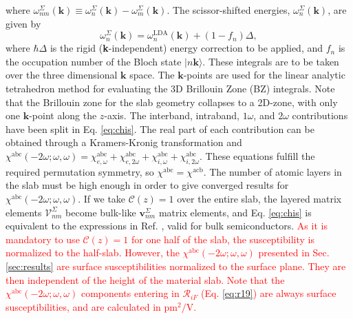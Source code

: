 \documentclass[prb,superscriptaddress,showpacs,twocolumn,letterpaper]{revtex4}
\newcommand{\correction}[1]{\textcolor{red}{#1}}
\begin{document}
where $\omega^\Sigma_{nm}(\mathbf{k})\equiv\omega^\Sigma_n(\mathbf{k})-\omega^
\Sigma_m(\mathbf{k})$. The scissor-shifted energies,
$\omega_{n}^\Sigma(\mathbf{k})$, are given by
\begin{equation*}
\omega_{n}^\Sigma(\mathbf{k})=
\omega^\mathrm{LDA}_{n}(\mathbf{k})+(1-f_{n})\Delta,
\end{equation*}
where $\hbar\Delta$ is the rigid (\textbf{k}-independent) energy correction to
be applied, and $f_n$ is the occupation number of the Bloch state
$|n\mathbf{k}\rangle$. These integrals are to be taken over the three
dimensional $\mathbf{k}$ space. The $\mathbf{k}$-points are used for the linear
analytic tetrahedron method for evaluating the 3D Brillouin Zone (BZ)
integrals.\cite{nastosPRB05} Note that the Brillouin zone for the slab geometry
collapses to a 2D-zone, with only one $\mathbf{k}$-point along the $z$-axis. The
interband, intraband, $1\omega$, and $2\omega$ contributions have been split in
Eq. \eqref{eq:chis}. The real part of each contribution can be obtained through
a Kramers-Kronig transformation\cite{nicolasPRB14} and
$\chi^{\text{a}\text{b}\text{c}}(-2\omega;\omega,\omega)=
 \chi^{\text{a}\text{b}\text{c}}_{e,\omega}
+\chi^{\text{a}\text{b}\text{c}}_{e,2\omega}
+\chi^{\text{a}\text{b}\text{c}}_{i,\omega}
+\chi^{\text{a}\text{b}\text{c}}_{i,2\omega}$. These equations fulfill the
required permutation symmetry, so
$\chi^{\text{a}\text{b}\text{c}}=\chi^{\text{a}\text{c}\text{b}}$. The number of
atomic layers in the slab must be high enough in order to give converged results
for $\chi^{\mathrm{abc}}(-2\omega;\omega,\omega)$. If we take $\mathcal{C}(z)=1$
over the entire slab, the layered matrix elements
$\boldsymbol{\mathcal{V}}^{\Sigma}_{nm}$ become bulk-like
$\mathbf{v}^{\Sigma}_{nm}$ matrix elements, and Eq. \eqref{eq:chis} is
equivalent to the expressions in Ref. , valid for bulk
semiconductors. 
\correction{
As it is mandatory to use $\mathcal{C}(z)=1$ for one half of the slab, the
susceptibility is normalized to the half-slab. However, the
$\chi^{\mathrm{abc}}(-2\omega;\omega,\omega)$ presented in Sec.
\ref{sec:results} are surface susceptibilities normalized to the surface plane.
They are then independent of the height of the material slab. Note that the
$\chi^{\mathrm{abc}}(-2\omega;\omega,\omega)$ components entering in
$\mathcal{R}_{iF}$ (Eq. \ref{eq:r19}) are always surface susceptibilities,
and are calculated in $\text{pm}^{2}/\text{V}$.} %
\end{document}
